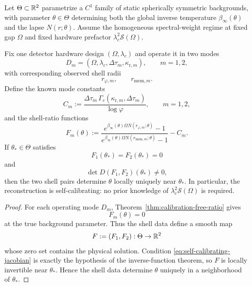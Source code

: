 \begin{theorem}\label{thm:self-calibrating-two-mode}
Let $\Theta\subset\mathbb{R}^2$ parametrize a $C^1$ family of static spherically symmetric backgrounds, with parameter $\theta\in\Theta$ determining both the global inverse temperature $\beta_\infty(\theta)$ and the lapse $N(r;\theta)$. Assume the homogeneous spectral-weight regime at fixed gap $\Omega$ and fixed hardware prefactor $\lambda_c^2\mathcal S(\Omega)$.

Fix one detector hardware design $(\Omega,\lambda_c)$ and operate it in two modes
\[
D_m=(\Omega,\lambda_c,\Delta\tau_m,\kappa_{{\mathrm r},m}),
\qquad
m=1,2,
\]
with corresponding observed shell radii
\[
r_{\varphi,m},
\qquad
r_{{\mathrm{mem}},m}.
\]
Define the known mode constants
\begin{equation}\label{eq:self-calibrating-constants}
C_m
:=
\frac{\Delta\tau_m\,\Gamma_c(\kappa_{{\mathrm r},m},\Delta\tau_m)}{\log\varphi},
\qquad
m=1,2,
\end{equation}
and the shell-ratio functions
\begin{equation}\label{eq:self-calibrating-functions}
F_m(\theta)
:=
\frac{
e^{\beta_\infty(\theta)\Omega N(r_{\varphi,m};\theta)}-1
}{
e^{\beta_\infty(\theta)\Omega N(r_{{\mathrm{mem}},m};\theta)}-1
}
-C_m.
\end{equation}
If $\theta_*\in\Theta$ satisfies
\[
F_1(\theta_*)=F_2(\theta_*)=0
\]
and
\begin{equation}\label{eq:self-calibrating-jacobian}
\det D(F_1,F_2)(\theta_*)\neq 0,
\end{equation}
then the two shell pairs determine $\theta$ locally uniquely near $\theta_*$. In particular, the reconstruction is self-calibrating: no prior knowledge of $\lambda_c^2\mathcal S(\Omega)$ is required.
\end{theorem}

\begin{proof}
For each operating mode $D_m$, Theorem~\ref{thm:calibration-free-ratio} gives
\[
F_m(\theta)=0
\]
at the true background parameter. Thus the shell data define a smooth map
\[
F:=(F_1,F_2):\Theta\to\mathbb{R}^2
\]
whose zero set contains the physical solution. Condition \eqref{eq:self-calibrating-jacobian} is exactly the hypothesis of the inverse-function theorem, so $F$ is locally invertible near $\theta_*$. Hence the shell data determine $\theta$ uniquely in a neighborhood of $\theta_*$.
\end{proof}

